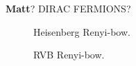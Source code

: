 \documentclass[prl,aps,twocolumn,floatfix,amsmath,amssymb,superscriptaddress,tightenlines]{revtex4}
\begin{document}
{\bf Matt}? DIRAC FERMIONS?

 \begin{figure}[ht]
   \begin{center}
   \end{center}
   \caption{Heisenberg Renyi-bow. }
   \label{fig:1}
 \end{figure}

 \begin{figure}[ht]
   \begin{center}
   \end{center}
   \caption{RVB Renyi-bow. }
   \label{fig:2}
 \end{figure}




\end{document}
